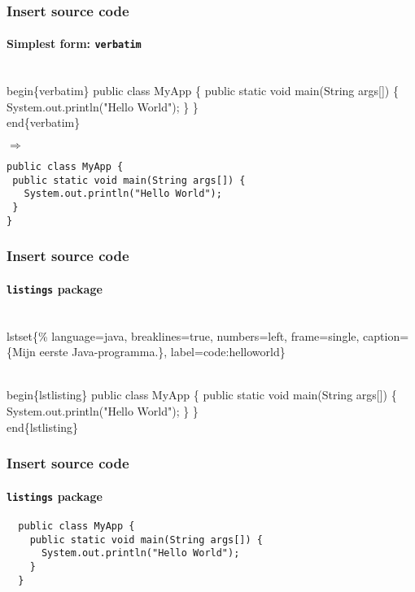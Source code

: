 \documentclass[aspectratio=169]{beamer}
\begin{document}
\begin{frame}[fragile]
 \frametitle{Insert source code}
 \framesubtitle{Simplest form: \texttt{verbatim}}

\begin{semiverbatim}
\alert{\\begin\{verbatim\}}
public class MyApp \{
 public static void main(String args[]) \{
   System.out.println("Hello World");
 \}
\}
\alert{\\end\{verbatim\}}
\end{semiverbatim}

 \(\Rightarrow\)

\begin{verbatim}
public class MyApp {
 public static void main(String args[]) {
   System.out.println("Hello World");
 }
}
\end{verbatim}

\end{frame}

\begin{frame}[fragile]
 \frametitle{Insert source code}
 \framesubtitle{\texttt{listings} package}

\begin{semiverbatim}
\\lstset\{\%
language=java,  breaklines=true,  numbers=left,
frame=single, caption=\{Mijn eerste Java-programma.\},
label=code:helloworld\}

\alert{\\begin\{lstlisting\}}
public class MyApp \{
 public static void main(String args[]) \{
   System.out.println("Hello World");
 \}
\}
\alert{\\end\{lstlisting\}}
\end{semiverbatim}

\end{frame}

\begin{frame}[fragile]
  \frametitle{Insert source code}
  \framesubtitle{\texttt{listings} package}


  \begin{lstlisting}
  public class MyApp {
    public static void main(String args[]) {
      System.out.println("Hello World");
    }
  }
  \end{lstlisting}

\end{frame}
\end{document}
